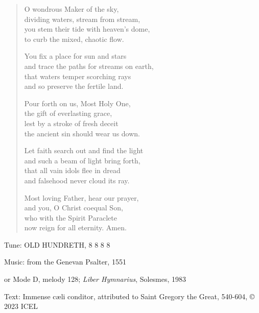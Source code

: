 \hymn

\begin{verse}
O wondrous Maker of the sky,\\
dividing waters, stream from stream,\\
you stem their tide with heaven’s dome,\\
to curb the mixed, chaotic flow.

You fix a place for sun and stars\\
and trace the paths for streams on earth,\\
that waters temper scorching rays\\
and so preserve the fertile land.

Pour forth on us, Most Holy One,\\
the gift of everlasting grace,\\
lest by a stroke of fresh deceit\\
the ancient sin should wear us down.

Let faith search out and find the light\\
and such a beam of light bring forth,\\
that all vain idols flee in dread\\
and falsehood never cloud its ray.

Most loving Father, hear our prayer,\\
and you, O Christ coequal Son,\\
who with the Spirit Paraclete\\
now reign for all eternity. Amen.
\end{verse}

\begin{hymnsource}
Tune: OLD HUNDRETH, 8 8 8 8

Music: from the Genevan Psalter, 1551

or Mode D, melody 128; \emph{Liber Hymnarius}, Solesmes, 1983

Text: Immense cæli conditor, attributed to Saint Gregory the Great, 540-604, © 2023 ICEL
\end{hymnsource}